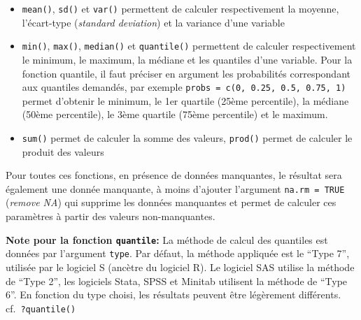 \documentclass[
]{book}
\providecommand{\tightlist}{%
  \setlength{\itemsep}{0pt}\setlength{\parskip}{0pt}}
\begin{document}
\begin{itemize}
\tightlist
\item
  \texttt{mean()}, \texttt{sd()} et \texttt{var()} permettent de calculer respectivement la moyenne, l'écart-type (\emph{standard deviation}) et la variance d'une variable
\item
  \texttt{min()}, \texttt{max()}, \texttt{median()} et \texttt{quantile()} permettent de calculer respectivement le minimum, le maximum, la médiane et les quantiles d'une variable. Pour la fonction quantile, il faut préciser en argument les probabilités correspondant aux quantiles demandés, par exemple \texttt{probs\ =\ c(0,\ 0.25,\ 0.5,\ 0.75,\ 1)} permet d'obtenir le minimum, le 1er quartile (25ème percentile), la médiane (50ème percentile), le 3ème quartile (75ème percentile) et le maximum.
\item
  \texttt{sum()} permet de calculer la somme des valeurs, \texttt{prod()} permet de calculer le produit des valeurs
\end{itemize}

Pour toutes ces fonctions, en présence de données manquantes, le résultat sera également une donnée manquante, à moins d'ajouter l'argument \texttt{na.rm\ =\ TRUE} (\emph{remove NA}) qui supprime les données manquantes et permet de calculer ces paramètres à partir des valeurs non-manquantes.

\textbf{Note pour la fonction \texttt{quantile}:} La méthode de calcul des quantiles est données par l'argument \texttt{type}. Par défaut, la méthode appliquée est le ``Type 7'', utilisée par le logiciel S (ancètre du logiciel R). Le logiciel SAS utilise la méthode de ``Type 2'', les logiciels Stata, SPSS et Minitab utilisent la méthode de ``Type 6''. En fonction du type choisi, les résultats peuvent être légèrement différents. cf.~\texttt{?quantile()}
\end{document}
